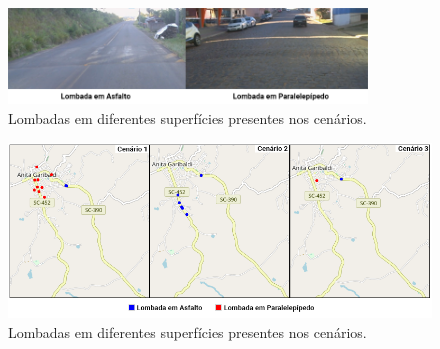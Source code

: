 \begin{figure}[h!]
  \centering
  \caption{Lombadas em diferentes superfícies presentes nos cenários.}
   \label{fig:lombadas_superficies}
   \includegraphics[width=0.85\textwidth]{figuras/fig_24.png}
\end{figure}

\begin{figure}[h!]
  \centering
  \caption{Lombadas em diferentes superfícies presentes nos cenários.}
   \label{fig:lombadas_mapa}
   \includegraphics[width=1\textwidth]{figuras/fig_26.png}
\end{figure}

